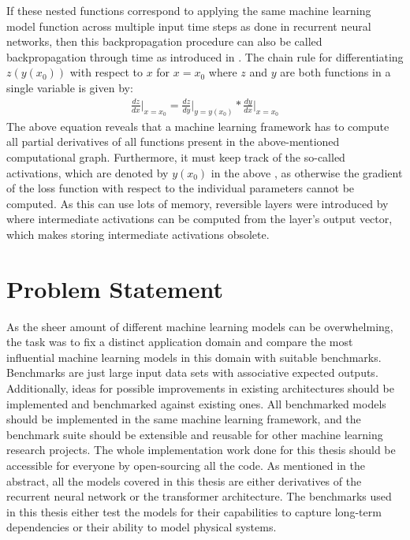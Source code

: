 \documentclass[draft,final]{vutinfth} %
\begin{document}
    If these nested functions correspond to applying the same machine learning model function across multiple input time steps as done in recurrent neural networks, then this backpropagation procedure can also be called backpropagation through time as introduced in \cite{GradientDescent}.
    The chain rule for differentiating $z(y(x_0))$ with respect to $x$ for $x=x_0$ where $z$ and $y$ are both functions in a single variable is given by:
    \begin{align}
        \label{chain_rule}
        \frac{dz}{dx} \Bigr\rvert_{x=x_0} = \frac{dz}{dy} \Bigr\rvert_{y=y(x_0)} * \frac{dy}{dx} \Bigr\rvert_{x=x_0}
    \end{align}
    The above equation reveals that a machine learning framework has to compute all partial derivatives of all functions present in the above-mentioned computational graph.
    Furthermore, it must keep track of the so-called activations, which are denoted by $y(x_0)$ in the above , as otherwise the gradient of the loss function with respect to the individual parameters cannot be computed.
    As this can use lots of memory, reversible layers were introduced by \cite{ReversibleLayer} where intermediate activations can be computed from the layer's output vector, which makes storing intermediate activations obsolete.


    \section{Problem Statement}
    As the sheer amount of different machine learning models can be overwhelming, the task was to fix a distinct application domain and compare the most influential machine learning models in this domain with suitable benchmarks.
    Benchmarks are just large input data sets with associative expected outputs.
    Additionally, ideas for possible improvements in existing architectures should be implemented and benchmarked against existing ones.
    All benchmarked models should be implemented in the same machine learning framework, and the benchmark suite should be extensible and reusable for other machine learning research projects.
    The whole implementation work done for this thesis should be accessible for everyone by open-sourcing all the code.
    As mentioned in the abstract, all the models covered in this thesis are either derivatives of the recurrent neural network or the transformer \cite{Transformer} architecture.
    The benchmarks used in this thesis either test the models for their capabilities to capture long-term dependencies or their ability to model physical systems.
\end{document}
